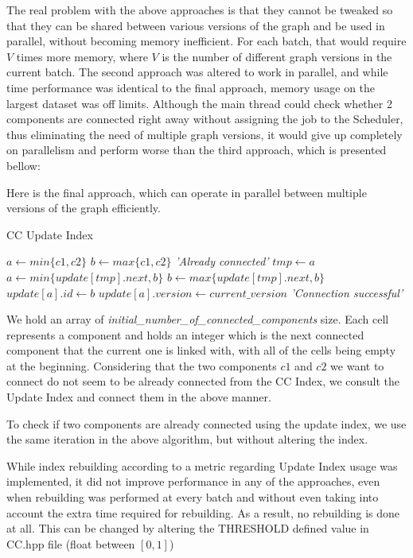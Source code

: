 \documentclass[12pt]{article}
\begin{document}
The real problem with the above approaches is that they cannot be tweaked so that they can be shared between various versions of the graph and be used in parallel,
without becoming memory inefficient. For each batch, that would require $V$ times more memory, where $V$ is the number of different graph versions in the current batch.
The second approach was altered to work in parallel, and while time performance was identical to the final approach, memory usage on the largest dataset was off limits.
Although the main thread could check whether 2 components are connected right away without assigning the job to the Scheduler, thus eliminating the need of multiple graph versions,
it would give up completely on parallelism and perform worse than the third approach, which is presented bellow:

Here is the final approach, which can operate in parallel between multiple versions of the graph efficiently.

\begin{algorithm}
\caption{CC Update Index}\label{euclid}
\begin{algorithmic}[1]
\State $a \gets min\{c1, c2\}$
\State $b \gets max\{c1, c2\}$
		\State \Return \textit{'Already connected'}
	\EndIf
	\State $tmp \gets a$
	\State $a \gets min\{update[tmp].next, b\}$
	\State $b \gets max\{update[tmp].next, b\}$
\EndWhile
\State $update[a].id \gets b$
\State $update[a].version \gets current\_version$
\State \Return \textit{'Connection successful'}
\EndProcedure
\end{algorithmic}
\end{algorithm}

We hold an array of \textit{initial\_number\_of\_connected\_components} size. Each cell represents a component and
holds an integer which is the next connected component that the current one is linked with, with all of the cells being empty at the beginning. 
Considering that the two components $c1$ and $c2$ we want to connect do not seem to be already 
connected from the CC Index, we consult the Update Index and connect them in the above manner.

To check if two components are already connected using the update index, we use the same iteration in the above algorithm, but without altering the index.

While index rebuilding according to a metric regarding Update Index usage was implemented, it did not improve performance in any of the approaches,
even when rebuilding was performed at every batch and without even taking into account the extra time required for rebuilding.
As a result, no rebuilding is done at all. This can be changed by altering the THRESHOLD defined value in CC.hpp file (float between $[0,1]$)
\end{document}
